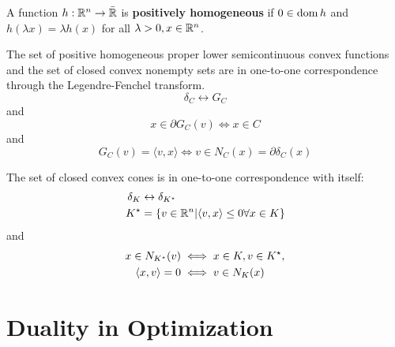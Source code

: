 \begin{defn}
  \label{defn:conjugate_functions:9}
  A function $h: \mathbb{R}^{n} \rightarrow \bar {\mathbb{R}}$ is \textbf{positively
    homogeneous} if $0 \in \operatorname*{dom} h$ and $h(\lambda x) = \lambda h(x)$
  for all $\lambda > 0, x \in \mathbb{R}^{n}$.
\end{defn}

\begin{proposition}
  The set of positive homogeneous proper lower semicontinuous convex
  functions and the set of closed convex nonempty sets are in
  one-to-one correspondence through the Legendre-Fenchel transform.
  \begin{equation}
    \label{eq:64}
    \delta_{C} \leftrightarrow G_{C}    
  \end{equation}
  and
  \begin{equation}
    \label{eq:65}
    x \in \partial G_{C}(v) \iff x \in C
  \end{equation}
  and
  \begin{equation}
    \label{eq:66}
    G_{C}(v) = \langle v, x \rangle \iff v \in N_{C}(x) = \partial \delta_{C}(x)
  \end{equation}

  The set of closed convex cones is in one-to-one correspondence with
  itself:
  \begin{align}
    \label{eq:67}
    \delta_{K} &\leftrightarrow \delta_{K^{\star}} \\
    K^{\star} &= \{ v \in \R^{n} | \IP{v, x} \leq 0 \forall
    x \in K \}
  \end{align}
  and
  \begin{align}
    \label{eq:128}
    x \in N_{K^{\star}}(v) &\iff x \in K, v \in K^{\star}, \\
    \IP{x, v} = 0 &\iff v \in N_{K}(x)
  \end{align}
\end{proposition}

\chapter{Duality in Optimization}
\label{cha:duality-optimization}

